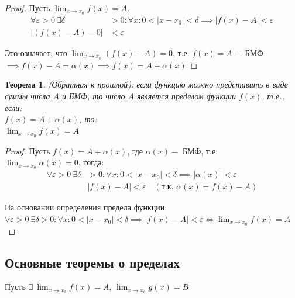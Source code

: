 \documentclass[12pt, a4paper]{article}
\newtheorem{theorem}{Теорема}[subsection]
\theoremstyle{remark}
\newcommand{\Y}{\mathbb{\forall}}
\newcommand{\F}{\mathbb{\exists}}
\newcommand{\E}{\mathbb{\varepsilon}}
\begin{document}
	\begin{proof}
		Пусть \(\lim_{x \to x_0} f(x) = A\). \\
		
		\begin{align*}
			\Y\E > 0 \ \F\delta &> 0: \Y x: 0 < |x - x_0| < \delta \implies |f(x) - A| < \E \\
			|(f(x) - A) - 0| &< \E
		\end{align*}
		
		Это означает, что \(\lim_{x \to x_0} (f(x) - A) = 0\), т.е. $f(x) = A -$ БМФ $\implies f(x) - A = \alpha(x) \implies f(x) = A + \alpha(x)$
	\end{proof}
	
	\begin{theorem}
		(Обратная к прошлой): если функцию можно представить в виде суммы числа $A$ и БМФ, то число $A$ является пределом функции $f(x)$, т.е., если: \\
		
		\(f(x) = A + \alpha(x)\), то: \\
		
		\(\lim_{x \to x_0} f(x) = A\) 
	\end{theorem}
	
	\begin{proof}
		Пусть \(f(x) = A + \alpha(x)\), где $\alpha(x) -$ БМФ, т.е: \\
		
		\(\lim_{x \to x_0} \alpha(x) = 0\), тогда: \\
		
		\begin{align*}
			\Y\E > 0 \ \F\delta &> 0: \Y x: 0 < |x - x_0| < \delta \implies |\alpha(x)| < \E \\
			&|f(x) - A| < \E \quad (\text{т.к. } \alpha(x) = f(x) - A)
		\end{align*}
		
		На основании определения предела функции: \\
		
		$\Y\E > 0 \ \F\delta > 0: \Y x: 0 < |x - x_0| < \delta \implies |f(x) - A| < \E \Longleftrightarrow \lim_{x \to x_0} f(x) = A$
	\end{proof}
	
	\newpage
	
	\subsection{Основные теоремы о пределах}
	
	Пусть $\F \ \lim_{x \to x_0} f(x) = A$, \(\lim_{x \to x_0} g(x) = B\)  
	
\end{document}
